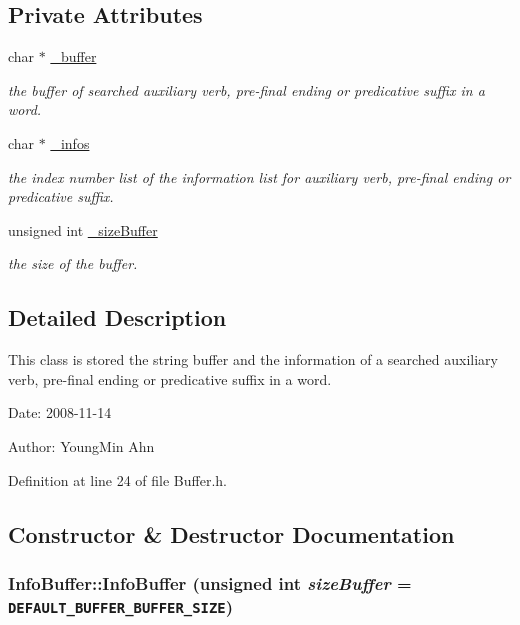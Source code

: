 \subsection*{Private Attributes}
\begin{CompactItemize}
\item 
char $\ast$ \hyperlink{classkmaOrange_1_1InfoBuffer_5582be7ee4e83958d9e30e82f185a1f3}{\_\-buffer}
\begin{CompactList}\small\item\em the buffer of searched auxiliary verb, pre-final ending or predicative suffix in a word. \item\end{CompactList}\item 
char $\ast$ \hyperlink{classkmaOrange_1_1InfoBuffer_8906a23d3b955cf8d7ecdab1af9ab05f}{\_\-infos}
\begin{CompactList}\small\item\em the index number list of the information list for auxiliary verb, pre-final ending or predicative suffix. \item\end{CompactList}\item 
unsigned int \hyperlink{classkmaOrange_1_1InfoBuffer_61f70057748766b665d4858562935716}{\_\-sizeBuffer}
\begin{CompactList}\small\item\em the size of the buffer. \item\end{CompactList}\end{CompactItemize}


\subsection{Detailed Description}
This class is stored the string buffer and the information of a searched auxiliary verb, pre-final ending or predicative suffix in a word. 

\begin{Desc}
\item[Date:]2008-11-14 \end{Desc}
\begin{Desc}
\item[Author:]YoungMin Ahn \end{Desc}


Definition at line 24 of file Buffer.h.

\subsection{Constructor \& Destructor Documentation}
\hypertarget{classkmaOrange_1_1InfoBuffer_13bfbfdc570346e62881d627a35c1621}{
\subsubsection[{InfoBuffer}]{\setlength{\rightskip}{0pt plus 5cm}InfoBuffer::InfoBuffer (unsigned int {\em sizeBuffer} = {\tt DEFAULT\_\-BUFFER\_\-BUFFER\_\-SIZE})}}
\label{classkmaOrange_1_1InfoBuffer_13bfbfdc570346e62881d627a35c1621}


